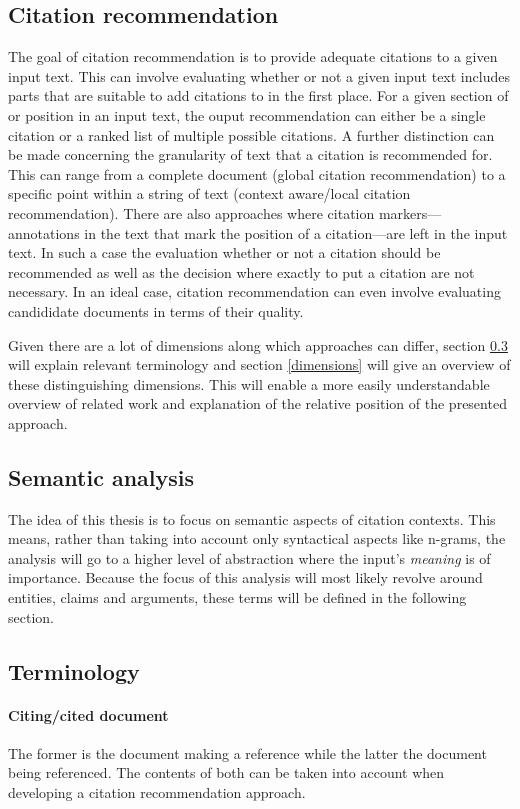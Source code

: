 \documentclass{proseminar}
\begin{document}
\subsection{Citation recommendation}
The goal of citation recommendation is to provide adequate citations to a given input text. This can involve evaluating whether or not a given input text includes parts that are suitable to add citations to in the first place. For a given section of or position in an input text, the ouput recommendation can either be a single citation or a ranked list of multiple possible citations. A further distinction can be made concerning the granularity of text that a citation is recommended for. This can range from a complete document (global citation recommendation) to a specific point within a string of text (context aware/local citation recommendation). There are also approaches where citation markers---annotations in the text that mark the position of a citation---are left in the input text. In such a case the evaluation whether or not a citation should be recommended as well as the decision where exactly to put a citation are not necessary. In an ideal case, citation recommendation can even involve evaluating candididate documents in terms of their quality.

Given there are a lot of dimensions along which approaches can differ, section \ref{terminology} will explain relevant terminology and section \ref{dimensions} will give an overview of these distinguishing dimensions. This will enable a more easily understandable overview of related work and explanation of the relative position of the presented approach.

\subsection{Semantic analysis}
The idea of this thesis is to focus on semantic aspects of citation contexts. This means, rather than taking into account only syntactical aspects like n-grams, the analysis will go to a higher level of abstraction where the input's \emph{meaning} is of importance. Because the focus of this analysis will most likely revolve around entities, claims and arguments, these terms will be defined in the following section.

\subsection{Terminology}\label{terminology}
\paragraph{Citing/cited document}
The former is the document making a reference while the latter the document being referenced. The contents of both can be taken into account when developing a citation recommendation approach.
\end{document}
